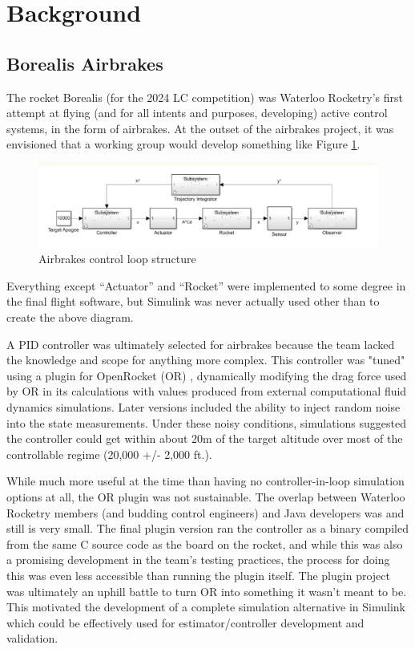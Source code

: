 \section{Background}

\subsection{Borealis Airbrakes}
\label{test}
The rocket Borealis (for the 2024 LC competition) was Waterloo Rocketry's first attempt at flying (and for all intents and purposes, developing) active control systems, in the form of airbrakes. At the outset of the airbrakes project, it was envisioned that a working group would develop something like Figure \ref{fig:ab-model}.

\begin{figure}[ht]
    \centering
    \includegraphics[width=0.8\linewidth]{images-plant/airbrakes.png}
    \caption{Airbrakes control loop structure}
    \label{fig:ab-model}
\end{figure}

Everything except ``Actuator'' and ``Rocket'' were implemented to some degree in the final flight software, but Simulink was never actually used other than to create the above diagram.

A PID controller was ultimately selected for airbrakes because the team lacked the knowledge and scope for anything more complex. This controller was "tuned" using a plugin for OpenRocket (OR) \cite{or-brake}, dynamically modifying the drag force used by OR in its calculations with values produced from external computational fluid dynamics simulations. Later versions included the ability to inject random noise into the state measurements. Under these noisy conditions, simulations suggested the controller could get within about 20m of the target altitude over most of the controllable regime (20,000 +/- 2,000 ft.). 

While much more useful at the time than having no controller-in-loop simulation options at all, the OR plugin was not sustainable. The overlap between Waterloo Rocketry members (and budding control engineers) and Java developers was and still is very small. The final plugin version ran the controller as a binary compiled from the same C source code as the board on the rocket, and while this was also a promising development in the team's testing practices, the process for doing this was even less accessible than running the plugin itself. The plugin project was ultimately an uphill battle to turn OR into something it wasn't meant to be. This motivated the development of a complete simulation alternative in Simulink which could be effectively used for estimator/controller development and validation.
